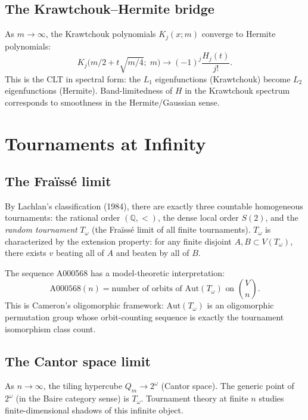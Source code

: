 \documentclass[11pt,a4paper]{article}
\theoremstyle{definition}
\theoremstyle{remark}
\newcommand{\Aut}{\mathrm{Aut}}
\begin{document}
\subsection{The Krawtchouk--Hermite bridge}

As $m \to \infty$, the Krawtchouk polynomials $K_j(x; m)$ converge to Hermite polynomials:
\[
K_j\bigl(m/2 + t\sqrt{m/4};\; m\bigr) \longrightarrow (-1)^j \frac{H_j(t)}{j!}.
\]
This is the CLT in spectral form: the $L_1$ eigenfunctions (Krawtchouk) become $L_2$ eigenfunctions (Hermite). Band-limitedness of $H$ in the Krawtchouk spectrum corresponds to smoothness in the Hermite/Gaussian sense.

\section{Tournaments at Infinity}
\label{sec:infinity}

\subsection{The Fra\"iss\'e limit}

By Lachlan's classification (1984), there are exactly three countable homogeneous tournaments: the rational order $(\mathbb{Q}, <)$, the dense local order $S(2)$, and the \emph{random tournament} $T_\omega$ (the Fra\"iss\'e limit of all finite tournaments). $T_\omega$ is characterized by the extension property: for any finite disjoint $A, B \subset V(T_\omega)$, there exists $v$ beating all of $A$ and beaten by all of $B$.

The sequence A000568 has a model-theoretic interpretation:
\[
\text{A000568}(n) = \text{number of orbits of } \Aut(T_\omega) \text{ on } \binom{V}{n}.
\]
This is Cameron's oligomorphic framework: $\Aut(T_\omega)$ is an oligomorphic permutation group whose orbit-counting sequence is exactly the tournament isomorphism class count.

\subsection{The Cantor space limit}

As $n \to \infty$, the tiling hypercube $Q_m \to 2^\omega$ (Cantor space). The generic point of $2^\omega$ (in the Baire category sense) is $T_\omega$. Tournament theory at finite $n$ studies finite-dimensional shadows of this infinite object.
\end{document}
